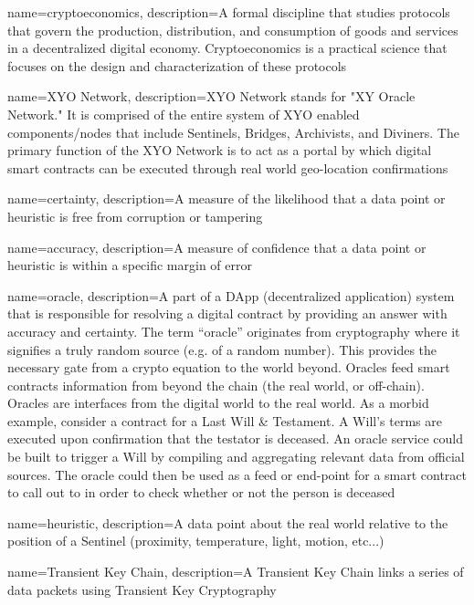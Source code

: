 \documentclass{article}
\begin{document}
{
    name={cryptoeconomics},
    description={A formal discipline that studies protocols that govern the production, distribution, and consumption of goods and services in a decentralized digital economy. Cryptoeconomics is a practical science that focuses on the design and characterization of these protocols}
}

{
    name={XYO Network},
    description={XYO Network stands for "XY Oracle Network." It is comprised of the entire system of XYO enabled components/nodes that include Sentinels, Bridges, Archivists, and Diviners. The primary function of the XYO Network is to act as a portal by which digital smart contracts can be executed through real world geo-location confirmations}
}

{
    name={certainty},
    description={A measure of the likelihood that a data point or heuristic is free from corruption or tampering}
}

{
    name={accuracy},
    description={A measure of confidence that a data point or heuristic is within a specific margin of error}
}

{
    name={oracle},
    description={A part of a DApp (decentralized application) system that is responsible for resolving a digital contract by providing an answer with accuracy and certainty. The term ``oracle'' originates from cryptography where it signifies a truly random source (e.g. of a random number). This provides the necessary gate from a crypto equation to the world beyond. Oracles feed smart contracts information from beyond the chain (the real world, or off-chain). Oracles are interfaces from the digital world to the real world. As a morbid example, consider a contract for a Last Will \& Testament. A Will's terms are executed upon confirmation that the testator is deceased. An oracle service could be built to trigger a Will by compiling and aggregating relevant data from official sources. The oracle could then be used as a feed or end-point for a smart contract to call out to in order to check whether or not the person is deceased}
}

{
    name={heuristic},
    description={A data point about the real world relative to the position of a Sentinel (proximity, temperature, light, motion, etc...)}
}

{
    name={Transient Key Chain},
    description={A Transient Key Chain links a series of data packets using Transient Key Cryptography}
}
\end{document}
